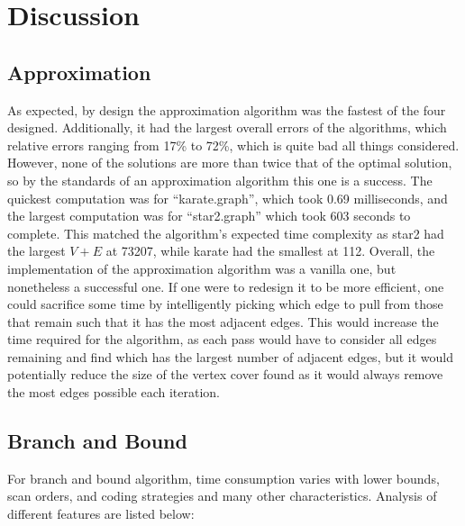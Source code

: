 \section{Discussion}
\subsection{Approximation}
As expected, by design the approximation algorithm was the fastest of the four designed. 
Additionally, it had the largest overall errors of the algorithms, which relative errors ranging from 17\% to 72\%, which is quite bad all things considered. 
However, none of the solutions are more than twice that of the optimal solution, so by the standards of an approximation algorithm this one is a success. 
The quickest computation was for ``karate.graph'', which took 0.69 milliseconds, and the largest computation was for ``star2.graph'' which took 603 seconds to complete.
This matched the algorithm's expected time complexity as star2 had the largest $V + E$ at 73207, while karate had the smallest at 112.  
Overall, the implementation of the approximation algorithm was a vanilla one, but nonetheless a successful one.
If one were to redesign it to be more efficient, one could sacrifice some time by intelligently picking which edge to pull from those that remain such that it has the most adjacent edges. 
This would increase the time required for the algorithm, as each pass would have to consider all edges remaining and find which has the largest number of adjacent edges, but it would potentially reduce the size of the vertex cover found as it would always remove the most edges possible each iteration. 
\subsection{Branch and Bound}
For branch and bound algorithm, time consumption varies with lower bounds, scan orders, and coding strategies and many other characteristics. Analysis of different features are listed below:
